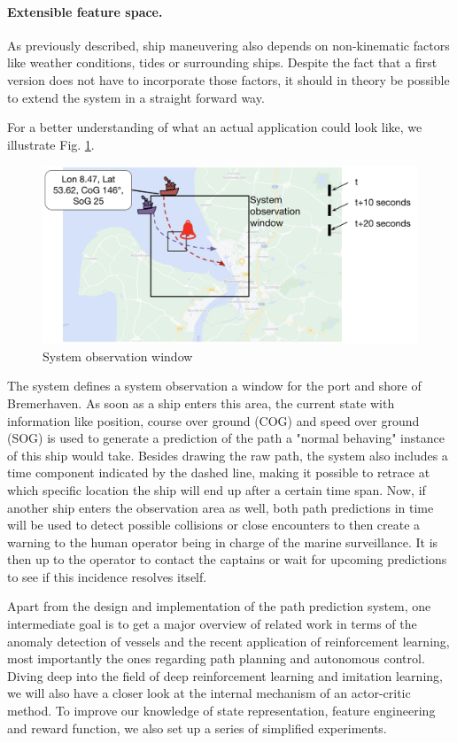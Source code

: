 \paragraph{Extensible feature space.}
As previously described, ship maneuvering also depends on non-kinematic factors like weather conditions, tides or surrounding ships. Despite the fact that a first version does not have to incorporate those factors, it should in theory be possible to extend the system in a straight forward way.


For a better understanding of what an actual application could look like, we illustrate Fig. \ref{fig:systemObservation}.
\begin{figure}[H]
    \centering
    \includegraphics[width=\textwidth]{images/system_observation.png}
    \caption{System observation window}
    \label{fig:systemObservation}
\end{figure}

The system defines a system observation a window for the port and shore of Bremerhaven. As soon as a ship enters this area, the current state with information like position, course over ground (COG) and speed over ground (SOG) is used to generate a prediction of the path a "normal behaving" instance of this ship would take. Besides drawing the raw path, the system also includes a time component indicated by the dashed line, making it possible to retrace at which specific location the ship will end up after a certain time span. Now, if another ship enters the observation area as well, both path predictions in time will be used to detect possible collisions or close encounters to then create a warning to the human operator being in charge of the marine surveillance. It is then up to the operator to contact the captains or wait for upcoming predictions to see if this incidence resolves itself.
\par
Apart from the design and implementation of the path prediction system, one intermediate goal is to get a major overview of related work in terms of the anomaly detection of vessels and the recent application of reinforcement learning, most importantly the ones regarding path planning and autonomous control. Diving deep into the field of deep reinforcement learning and imitation learning, we will also have a closer look at the internal mechanism of an actor-critic method. To improve our knowledge of state representation, feature engineering and reward function, we also set up a series of simplified experiments.